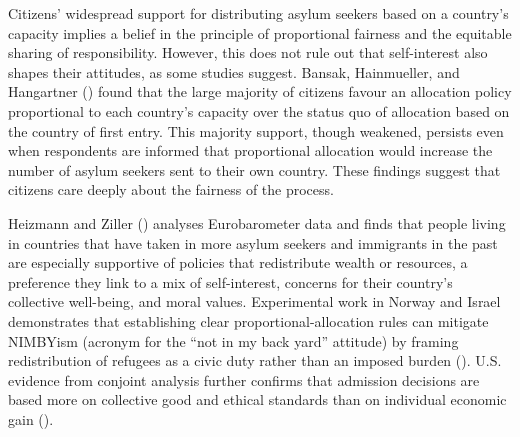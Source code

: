 \documentclass[
  12pt,
  a4paper,
]{article}
\begin{document}
Citizens' widespread support for distributing asylum seekers based on a country's capacity implies a belief in the principle of proportional fairness and the equitable sharing of responsibility. However, this does not rule out that self-interest also shapes their attitudes, as some studies suggest. Bansak, Hainmueller, and Hangartner () found that the large majority of citizens favour an allocation policy proportional to each country's capacity over the status quo of allocation based on the country of first entry. This majority support, though weakened, persists even when respondents are informed that proportional allocation would increase the number of asylum seekers sent to their own country. These findings suggest that citizens care deeply about the fairness of the process.

Heizmann and Ziller () analyses Eurobarometer data and finds that people living in countries that have taken in more asylum seekers and immigrants in the past are especially supportive of policies that redistribute wealth or resources, a preference they link to a mix of self-interest, concerns for their country's collective well-being, and moral values. Experimental work in Norway and Israel demonstrates that establishing clear proportional-allocation rules can mitigate NIMBYism (acronym for the ``not in my back yard'' attitude) by framing redistribution of refugees as a civic duty rather than an imposed burden (). U.S. evidence from conjoint analysis further confirms that admission decisions are based more on collective good and ethical standards than on individual economic gain ().
\end{document}
